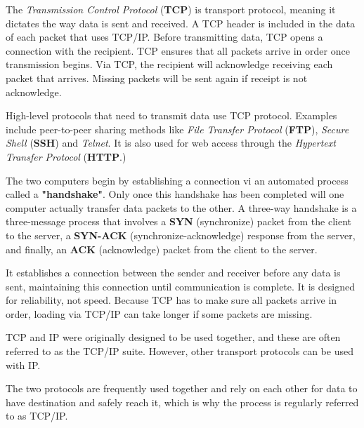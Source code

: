 The \emph{Transmission Control Protocol} (\textbf{TCP}) is transport protocol, meaning it dictates the way data is sent and received. A TCP header is included in the data of each packet that uses TCP/IP. Before transmitting data, TCP opens a connection with the recipient. TCP ensures that all packets arrive in order once transmission begins. Via TCP, the recipient will acknowledge receiving each packet that arrives. Missing packets will be sent again if receipt is not acknowledge.

High-level protocols that need to transmit data use TCP protocol. Examples include peer-to-peer sharing methods like \textit{File Transfer Protocol} (\textbf{FTP}), \textit{Secure Shell} (\textbf{SSH}) and \textit{Telnet}. It is also used for web access through the \textit{Hypertext Transfer Protocol} (\textbf{HTTP}.)

The two computers begin by establishing a connection vi an automated process called a \textbf{"handshake"}. Only once this handshake has been completed will one computer actually transfer data packets to the other. A three-way handshake is a three-message process that involves a \textbf{SYN} (synchronize) packet from the client to the server, a \textbf{SYN-ACK} (synchronize-acknowledge) response from the server, and finally, an \textbf{ACK} (acknowledge) packet from the client to the server.

It establishes a connection between the sender and receiver before any data is sent, maintaining this connection until communication is complete. It is designed for reliability, not speed. Because TCP has to make sure all packets arrive in order, loading via TCP/IP can take longer if some packets are missing.

TCP and IP were originally designed to be used together, and these are often referred to as the TCP/IP suite. However, other transport protocols can be used with IP.

The two protocols are frequently used together and rely on each other for data to have destination and safely reach it, which is why the process is regularly referred to as TCP/IP.
